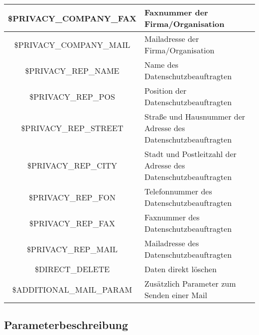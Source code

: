 \begin{longtable}[H]{|c|l|}
		\$PRIVACY\_COMPANY\_FAX    & Faxnummer der Firma/Organisation                                                                                                     \\ \hline	
		\$PRIVACY\_COMPANY\_MAIL   & Mailadresse der Firma/Organisation                                                                                                     \\ \hline	
		\$PRIVACY\_REP\_NAME      & Name des Datenschutzbeauftragten                                                                                                     \\ \hline
		\$PRIVACY\_REP\_POS       & Position der Datenschutzbeauftragten 																										\\ \hline
		\$PRIVACY\_REP\_STREET    & Straße und Hausnummer der Adresse des Datenschutzbeauftragten                                                                                                     \\ \hline	
		\$PRIVACY\_REP\_CITY      & Stadt und Postleitzahl der Adresse des Datenschutzbeauftragten                                                                                                     \\ \hline	
		\$PRIVACY\_REP\_FON       & Telefonnummer des Datenschutzbeauftragten                                                                                                     \\ \hline	
		\$PRIVACY\_REP\_FAX       & Faxnummer des Datenschutzbeauftragten                                                                                                     \\ \hline	
		\$PRIVACY\_REP\_MAIL      & Mailadresse des Datenschutzbeauftragten                                                                                                     \\ \hline		
		\$DIRECT\_DELETE          & Daten direkt löschen                                                                                                     \\ \hline
		\$ADDITIONAL\_MAIL\_PARAM & Zusätzlich Parameter zum Senden einer Mail 	                                                                             \\ \hline
\end{longtable}
\newpage
\subsection{Parameterbeschreibung}
